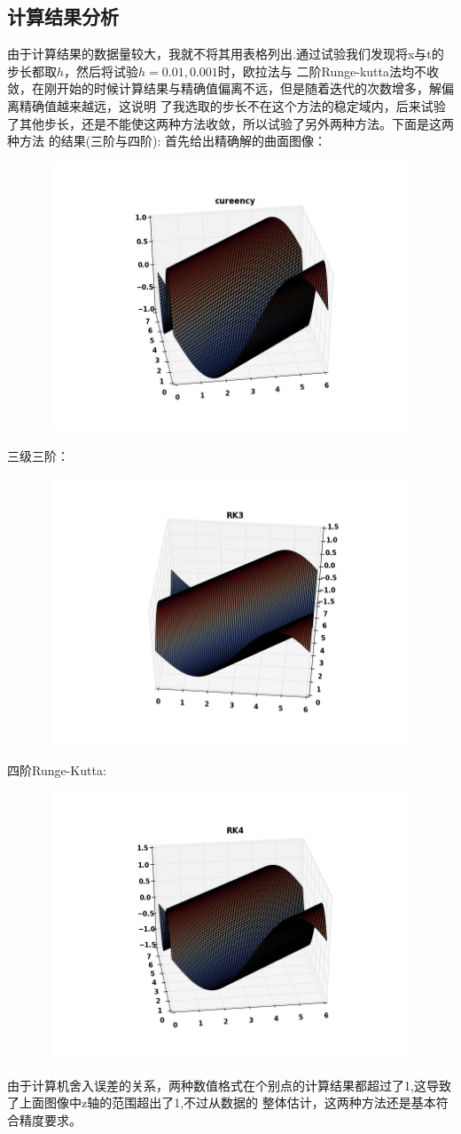 \documentclass[10pt,a4paper]{ctexart}
\begin{document}
\subsection{计算结果分析}
由于计算结果的数据量较大，我就不将其用表格列出.通过试验我们发现将x与t的步长都取$h$，然后将试验$h=0.01,0.001$时，欧拉法与
二阶Runge-kutta法均不收敛，在刚开始的时候计算结果与精确值偏离不远，但是随着迭代的次数增多，解偏离精确值越来越远，这说明
了我选取的步长不在这个方法的稳定域内，后来试验了其他步长，还是不能使这两种方法收敛，所以试验了另外两种方法。下面是这两种方法
的结果(三阶与四阶):
首先给出精确解的曲面图像：
\par
\centerline{\includegraphics[height=8cm,width=14cm]{6.5.png}}
\par
三级三阶：
\par
\centerline{\includegraphics[height=8cm,width=14cm]{6.5.3.png}}
\par
四阶Runge-Kutta:
\par
\centerline{\includegraphics[height=8cm,width=14cm]{6.5.4.png}}
\par
由于计算机舍入误差的关系，两种数值格式在个别点的计算结果都超过了1,这导致了上面图像中z轴的范围超出了1,不过从数据的
整体估计，这两种方法还是基本符合精度要求。
\end{document}
